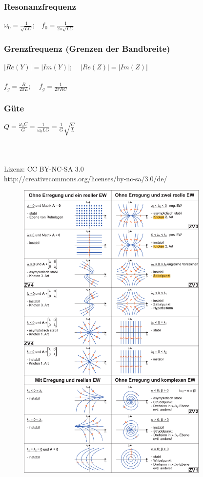 \documentclass[a4paper,twocolumn,10pt]{article}
\begin{document}
\subsubsection*{Resonanzfrequenz}
$\omega_0 =\frac{1}{\sqrt{LC}};\;\;\;f_0=\frac{1}{2\pi \sqrt{LC}}$
\subsubsection*{Grenzfrequenz (Grenzen der Bandbreite)}
$|Re(Y)|=|Im(Y)|;\;\;\;\;|Re(Z)|=|Im(Z)|$\\\\
$f_g=\frac{R}{2\pi L};\;\;\;\;f_g=\frac{1}{2\pi RC}$
\subsubsection*{Güte}
$Q=\frac{\omega_0 C}{G}=\frac{1}{\omega_0 LG}=\frac{1}{G}\sqrt{\frac{C}{L}}$
\\\\\\\\
Lizenz: CC BY-NC-SA 3.0\\
http://creativecommons.org/licenses/by-nc-sa/3.0/de/
\newpage
\begin{figure}
\begin{center}
\includegraphics[width=0.85\textwidth]{img/Phasenportraits}
\end{center}
\end{figure}
\end{document}

